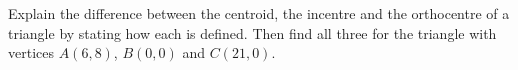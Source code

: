Explain the difference between the centroid, the incentre and the orthocentre of a triangle by stating how each is defined. Then find all three for the triangle with vertices $A(6,8)$, $B(0,0)$ and $C(21,0)$.
